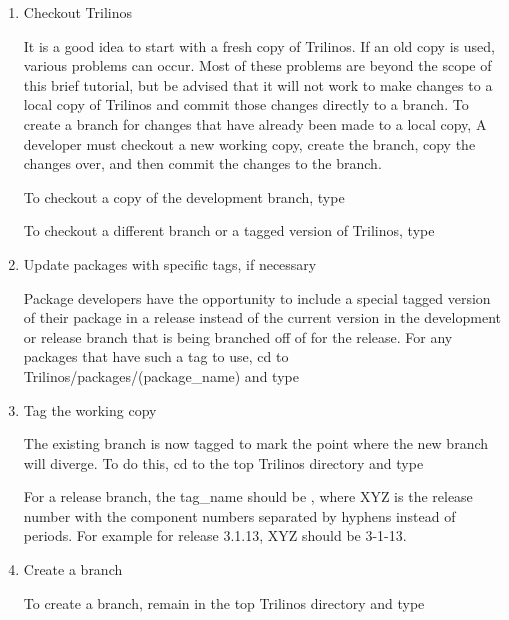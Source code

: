 \documentclass[12pt,relax]{TrilinosDevGuide}
\begin{document}
\begin{enumerate}
\item Checkout Trilinos

It is a good idea to start with a fresh copy of Trilinos.  If an old copy is 
used, various problems can occur.  Most of these problems are beyond the scope 
of this brief tutorial, but be advised that it will not work to make changes 
to a local copy of Trilinos and commit those changes directly to 
a branch.  To create a branch for changes that have already been made to a 
local copy, A developer must checkout a new working copy, create the branch, 
copy the changes over, and then commit the changes to the branch.  

To checkout a copy of the development branch, type


To checkout a different branch or a tagged version of Trilinos, type


\item Update packages with specific tags, if necessary

Package developers have the opportunity to include a special tagged version of 
their package in a release instead of the current version in the 
development or release branch that is being branched off of for the release.  
For any packages that have such a tag to use, cd to 
Trilinos/packages/(package\_name) and type


\item Tag the working copy

The existing branch is now tagged to mark the point where the new branch 
will diverge.  To do this, cd to the top Trilinos 
directory and type


For a release branch, the tag\_name should be 
, where XYZ is the 
release number with the component numbers separated by hyphens instead of 
periods.  For example for release 3.1.13, XYZ should be 3-1-13.

\item Create a branch

To create a branch, remain in the top Trilinos directory and type


\end{enumerate}
\end{document}

